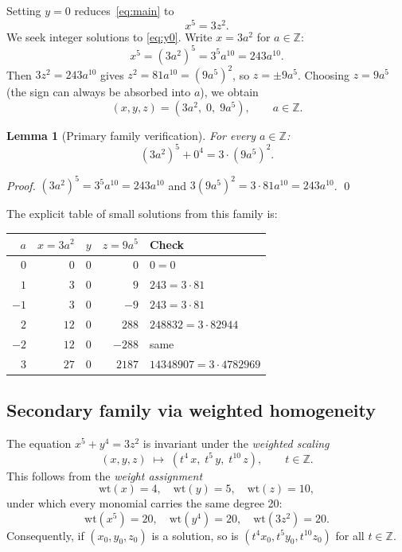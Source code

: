 \documentclass[12pt,a4paper]{article}
\newtheorem{lemma}[theorem]{Lemma}
\theoremstyle{definition}
\newcommand{\Z}{\mathbb{Z}}
\begin{document}
Setting $y = 0$ reduces~\eqref{eq:main} to
\begin{equation}\label{eq:y0}
  x^5 = 3z^2.
\end{equation}
We seek integer solutions to \eqref{eq:y0}.  Write $x = 3a^2$ for $a \in \Z$:
\[
  x^5 = (3a^2)^5 = 3^5 a^{10} = 243 a^{10}.
\]
Then $3z^2 = 243a^{10}$ gives $z^2 = 81a^{10} = (9a^5)^2$, so $z = \pm 9a^5$. 
Choosing $z = 9a^5$ (the sign can always be absorbed into $a$), we obtain
\[
  (x, y, z) = (3a^2,\; 0,\; 9a^5), \qquad a \in \Z.
\]

\begin{lemma}[Primary family verification]\label{lem:primary}
  For every $a \in \Z$:
  \[
    (3a^2)^5 + 0^4 = 3 \cdot (9a^5)^2.
  \]
\end{lemma}
\begin{proof}
  $(3a^2)^5 = 3^5 a^{10} = 243 a^{10}$ and $3(9a^5)^2 = 3 \cdot 81 a^{10} = 243 a^{10}$. \qed
\end{proof}

The explicit table of small solutions from this family is:

\begin{center}
\begin{tabular}{rrrrl}
  \toprule
  $a$ & $x = 3a^2$ & $y$ & $z = 9a^5$ & Check\\
  \midrule
  $0$  & $0$   & $0$ & $0$       & $0=0$ \\
  $1$  & $3$   & $0$ & $9$       & $243 = 3\cdot81$ \\
  $-1$ & $3$   & $0$ & $-9$      & $243 = 3\cdot81$ \\
  $2$  & $12$  & $0$ & $288$     & $248832 = 3\cdot82944$ \\
  $-2$ & $12$  & $0$ & $-288$    & same \\
  $3$  & $27$  & $0$ & $2187$    & $14348907 = 3\cdot4782969$ \\
  \bottomrule
\end{tabular}
\end{center}

\subsection{Secondary family via weighted homogeneity}\label{sec:secondary}

The equation $x^5 + y^4 = 3z^2$ is invariant under the \emph{weighted scaling}
\[
  (x, y, z) \;\longmapsto\; (t^4\, x,\; t^5\, y,\; t^{10}\, z), \qquad t \in \Z.
\]
This follows from the \emph{weight assignment}
\[
  \mathrm{wt}(x) = 4,\quad \mathrm{wt}(y) = 5, \quad \mathrm{wt}(z) = 10,
\]
under which every monomial carries the same degree 20:
\[
  \mathrm{wt}(x^5) = 20, \quad \mathrm{wt}(y^4) = 20, \quad \mathrm{wt}(3z^2) = 20.
\]
Consequently, if $(x_0, y_0, z_0)$ is a solution, so is $(t^4 x_0, t^5 y_0, t^{10} z_0)$ for all $t \in \Z$.
\end{document}
